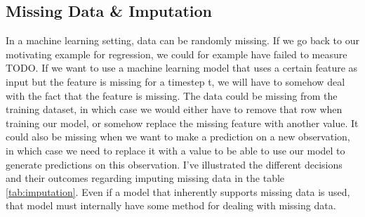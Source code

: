 %
%
%
%
%
%
%
%
%
%
%
%
\subsection{Missing Data \& Imputation}

In a machine learning setting, data can be randomly missing. If we go back to
our motivating example for regression, we could for example have failed to
measure TODO. If we want to use a machine learning model that uses a certain
feature as input but the feature is missing for a timestep t, we will have to
somehow deal with the fact that the feature is missing. The data could be
missing from the training dataset, in which case we would either have to remove
that row when training our model, or somehow replace the missing feature with
another value. It could also be missing when we want to make a prediction on a
new observation, in which case we need to replace it with a value to be able to
use our model to generate predictions on this observation. I've illustrated the
different decisions and their outcomes regarding imputing missing data in the
table \ref{tab:imputation}. Even if a model that inherently supports missing
data is used, that model must internally have some method for dealing with
missing data.

